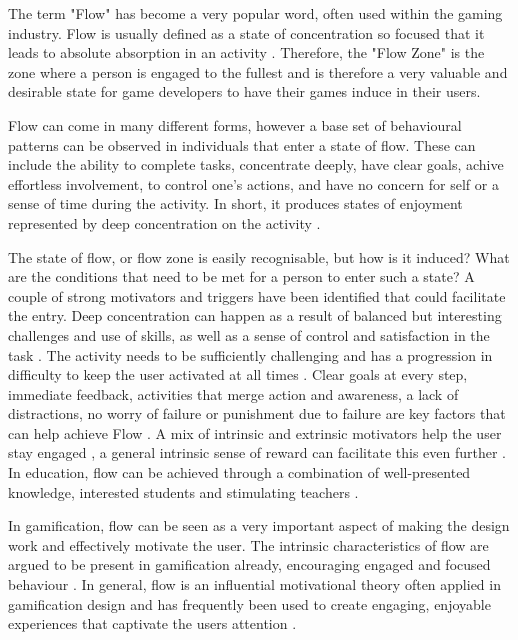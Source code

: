 The term "Flow" has become a very popular word, often used within the gaming industry. Flow is usually defined as a state of concentration so focused that it leads to absolute absorption in an activity \cite{higher}. Therefore, the "Flow Zone" is the zone where a person is engaged to the fullest \cite{mmo} and is therefore a very valuable and desirable state for game developers to have their games induce in their users.

Flow can come in many different forms, however a base set of behavioural patterns can be observed in individuals that enter a state of flow. These can include the ability to complete tasks, concentrate deeply, have clear goals, achive effortless involvement, to control one's actions, and have no concern for self or a sense of time during the activity. In short, it produces states of enjoyment represented by deep concentration on the activity \cite{higher}.

The state of flow, or flow zone is easily recognisable, but how is it induced? What are the conditions that need to be met for a person to enter such a state? A couple of strong motivators and triggers have been identified that could facilitate the entry.
Deep concentration can happen as a result of balanced but interesting challenges and use of skills, as well as a sense of control and satisfaction in the task \cite{engage} \cite{equilibrium}.
The activity needs to be sufficiently challenging and has a progression in difficulty to keep the user activated at all times \cite{higher} \cite{equilibrium}.
Clear goals at every step, immediate feedback, activities that merge action and awareness, a lack of distractions, no worry of failure or punishment due to failure are key factors that can help achieve Flow \cite{mmo} \cite{equilibrium}.
A mix of intrinsic and extrinsic motivators help the user stay engaged \cite{mmo}, a general intrinsic sense of reward can facilitate this even further \cite{equilibrium}.
In education, flow can be achieved through a combination of well-presented knowledge, interested students and stimulating teachers \cite{higher}.

In gamification, flow can be seen as a very important aspect of making the design work and effectively motivate the user.
The intrinsic characteristics of flow are argued to be present in gamification already, encouraging engaged and focused behaviour \cite{higher}.
In general, flow is an influential motivational theory often applied in gamification design and has frequently been used to create engaging, enjoyable experiences that captivate the users attention \cite{equilibrium}.